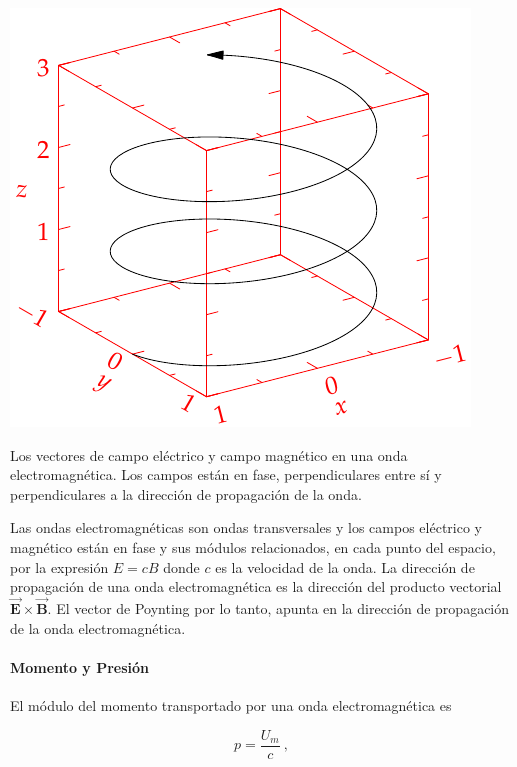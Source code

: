 \documentclass{tufte-handout}
\begin{document}
\begin{marginfigure}%
    \centering
    \includegraphics[width=\linewidth]{helix}
    \caption{Los vectores de campo eléctrico y campo magnético en una onda electromagnética. Los campos están en fase, perpendiculares entre sí y perpendiculares a la dirección de propagación de la onda.}
    \label{fig:ondaelectromagnetica}
\end{marginfigure}

Las ondas electromagnéticas son ondas transversales y los campos eléctrico y magnético están en fase y sus módulos relacionados, en cada punto del espacio, por la expresión $E = cB$  donde $c$ es la velocidad de la onda. La dirección de propagación de una onda electromagnética es la dirección del producto vectorial $\mathbf{\vec{E}}\times\mathbf{\vec{B}}$. El vector de Poynting por lo tanto, apunta en la dirección de propagación de la onda electromagnética.

\paragraph{Momento y Presión}

El módulo del momento transportado por una onda electromagnética es

\begin{equation}
p = \displaystyle\frac{U_m}{c}~,
\end{equation}
\end{document}
